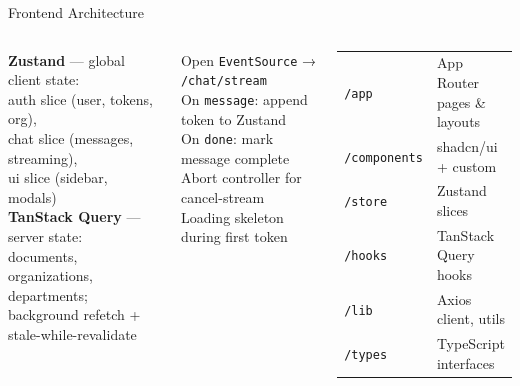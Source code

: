 \documentclass[aspectratio=169,12pt]{beamer}
\begin{document}
\begin{frame}{Frontend Architecture}
\begin{columns}[T]
  \begin{tcolorbox}[mybox,title={State Management}]
    \tiny
    \textbf{Zustand} — global client state:\\
    auth slice (user, tokens, org),\\
    chat slice (messages, streaming),\\
    ui slice (sidebar, modals)\\[4pt]
    \textbf{TanStack Query} — server state:\\
    documents, organizations, departments;\\
    background refetch + stale-while-revalidate
  \end{tcolorbox}
  \vspace{4pt}
  \begin{tcolorbox}[mybox,title={Streaming Chat UI}]
    \tiny
    Open \texttt{EventSource} → \texttt{/chat/stream}\\
    On \texttt{message}: append token to Zustand\\
    On \texttt{done}: mark message complete\\
    Abort controller for cancel-stream\\
    Loading skeleton during first token
  \end{tcolorbox}
  \vspace{4pt}
  \begin{tcolorbox}[mybox,title={Frontend Folder Structure}]
    \tiny
    \begin{tabular}{@{}ll@{}}
    \texttt{/app} & App Router pages \& layouts\\
    \texttt{/components} & shadcn/ui + custom\\
    \texttt{/store} & Zustand slices\\
    \texttt{/hooks} & TanStack Query hooks\\
    \texttt{/lib} & Axios client, utils\\
    \texttt{/types} & TypeScript interfaces\\
    \end{tabular}
  \end{tcolorbox}
\end{columns}
\end{frame}
\end{document}

